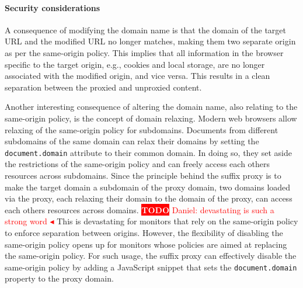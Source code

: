 \documentclass{llncs}
\newcommand{\todo}[1]{\colorbox{red}{\textcolor{white}{\sffamily\bfseries\scriptsize TODO}} \textcolor{red}{#1} \textcolor{red}{$\blacktriangleleft$}}
\begin{document}






\paragraph{Security considerations}

A consequence of modifying the domain name is that the domain of the
target URL and the modified URL no longer matches, making them two 
separate origin as per the same-origin policy. This implies that all information in 
the browser specific to the target origin, e.g., cookies and local storage, 
are no longer associated with the modified origin, and vice versa. This results 
in a clean separation between the proxied and unproxied content.  

Another interesting consequence of altering the domain name, also relating to 
the same-origin policy, is the concept of domain relaxing. Modern web browsers 
allow relaxing of the same-origin policy for subdomains. Documents from different subdomains of the same 
domain can relax their domains by setting the \lstinline{document.domain} attribute
to their common domain. In doing so, they set aside the restrictions of the 
same-origin policy and can freely access each others resources across subdomains. 
Since the principle behind the suffix proxy is to make the target domain a subdomain of the proxy domain, two 
domains loaded via the proxy, each relaxing their domain to the domain of the 
proxy, can access each others resources across domains.
\todo{Daniel: devastating is such a strong word}
This is devastating for monitors that rely on the same-origin policy to enforce 
separation between origins. However, the flexibility of disabling the same-origin
policy opens up for monitors whose policies are aimed
at replacing the same-origin policy. 
For such usage, the suffix proxy can effectively disable the same-origin 
policy by adding a JavaScript snippet that sets the \lstinline{document.domain} property
to the proxy domain. 
\end{document}
